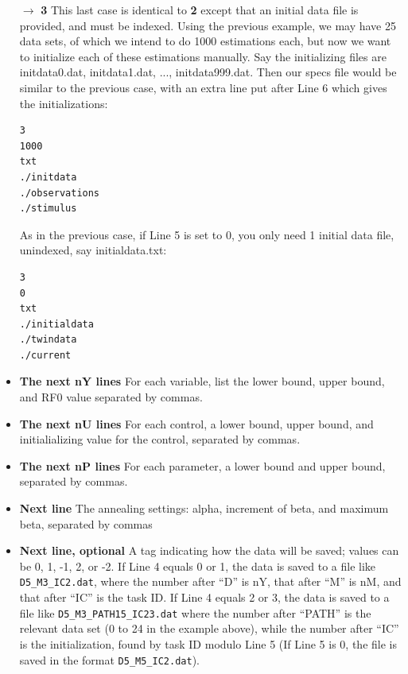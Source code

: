 \documentclass[11pt]{article}
\begin{document}
{\begin{itemize}
Finally, there is one special case: when Line 5 equals 0. In this case, all observations and stimuli are still in a single data file, but now you do not have multiple indexed datasets. For example, you have a single data file of \texttt{twindata.dat} and stimulus file \texttt{current.dat}. Then Lines 4-8 should read:

\begin{verbatim}
2
0 
dat 
./twindata
./current
\end{verbatim}

In this case, there is only 1 dataset, so the task ID will correspond directly to the initializating guess. 

\item[$\rightarrow$] {\bf 3} This last case is identical to {\bf 2} except that an initial data file is provided, and must be indexed. Using the previous example, we may have 25 data sets, of which we intend to do 1000 estimations each, but now we want to initialize each of these estimations manually. Say the initializing files are initdata0.dat, initdata1.dat, ..., initdata999.dat. Then our specs file would be similar to the previous case, with an extra line put after Line 6 which gives the initializations:

\begin{verbatim}
3
1000 
txt
./initdata 
./observations 
./stimulus  
\end{verbatim}

As in the previous case, if Line 5 is set to 0, you only need 1 initial data file, unindexed, say initialdata.txt:

\begin{verbatim}
3
0
txt
./initialdata 
./twindata 
./current 
\end{verbatim}

\item {\bf The next nY lines} For each variable, list the lower bound, upper bound, and RF0 value separated by commas.
\item {\bf The next nU lines} For each control, a lower bound, upper bound, and initialializing value for the control, separated by commas.
\item {\bf The next nP lines} For each parameter, a lower bound and upper bound, separated by commas.
\item {\bf Next line} The annealing settings: alpha, increment of beta, and maximum beta, separated by commas
\item {\bf Next line, optional} A tag indicating how the data will be saved; values can be 0, 1, -1, 2, or -2. If Line 4 equals 0 or 1, the data is saved to a file like \texttt{D5\_M3\_IC2.dat}, where the number after ``D'' is nY, that after ``M'' is nM, and that after ``IC'' is the task ID. If Line 4 equals 2 or 3, the data is saved to a file like \texttt{D5\_M3\_PATH15\_IC23.dat} where the number after ``PATH'' is the relevant data set (0 to 24 in the example above), while the number after ``IC'' is the initialization, found by task ID modulo Line 5 (If Line 5 is 0, the file is saved in the format \texttt{D5\_M5\_IC2.dat}).


\end{itemize}}
\end{document}
